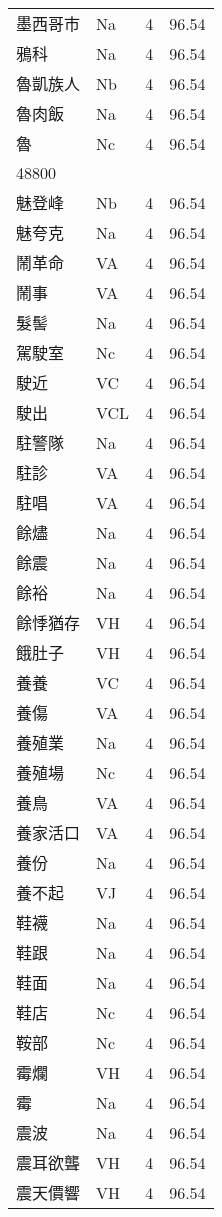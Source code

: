 \documentclass[twocolumn]{book}
\begin{document}
\begin{supertabular}{llrr}
墨西哥市 & Na & 4 &  96.54\\
鴉科 & Na & 4 &  96.54\\
魯凱族人 & Nb & 4 &  96.54\\
魯肉飯 & Na & 4 &  96.54\\
魯 & Nc & 4 &  96.54\\
48800\\
魅登峰 & Nb & 4 &  96.54\\
魅夸克 & Na & 4 &  96.54\\
鬧革命 & VA & 4 &  96.54\\
鬧事 & VA & 4 &  96.54\\
髮髻 & Na & 4 &  96.54\\
駕駛室 & Nc & 4 &  96.54\\
駛近 & VC & 4 &  96.54\\
駛出 & VCL & 4 &  96.54\\
駐警隊 & Na & 4 &  96.54\\
駐診 & VA & 4 &  96.54\\
駐唱 & VA & 4 &  96.54\\
餘燼 & Na & 4 &  96.54\\
餘震 & Na & 4 &  96.54\\
餘裕 & Na & 4 &  96.54\\
餘悸猶存 & VH & 4 &  96.54\\
餓肚子 & VH & 4 &  96.54\\
養養 & VC & 4 &  96.54\\
養傷 & VA & 4 &  96.54\\
養殖業 & Na & 4 &  96.54\\
養殖場 & Nc & 4 &  96.54\\
養鳥 & VA & 4 &  96.54\\
養家活口 & VA & 4 &  96.54\\
養份 & Na & 4 &  96.54\\
養不起 & VJ & 4 &  96.54\\
鞋襪 & Na & 4 &  96.54\\
鞋跟 & Na & 4 &  96.54\\
鞋面 & Na & 4 &  96.54\\
鞋店 & Nc & 4 &  96.54\\
鞍部 & Nc & 4 &  96.54\\
霉爛 & VH & 4 &  96.54\\
霉 & Na & 4 &  96.54\\
震波 & Na & 4 &  96.54\\
震耳欲聾 & VH & 4 &  96.54\\
震天價響 & VH & 4 &  96.54\\

\end{supertabular}
\end{document}
